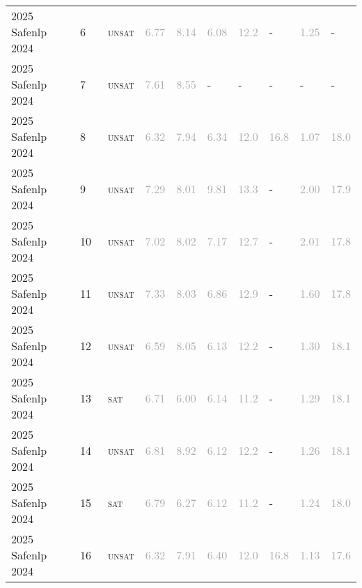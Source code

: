 \begin{center}
{\begin{longtable}{@{}llllllllll@{}}
2025 Safenlp 2024 & 6 & ~\textsc{unsat} & \textcolor{darkgray}{6.77} & \textcolor{darkgray}{8.14} & \textcolor{darkgray}{6.08} & \textcolor{darkgray}{12.2} & - & \textcolor{darkgray}{1.25} & - \\
2025 Safenlp 2024 & 7 & ~\textsc{unsat} & \textcolor{darkgray}{7.61} & \textcolor{darkgray}{8.55} & - & - & - & - & - \\
2025 Safenlp 2024 & 8 & ~\textsc{unsat} & \textcolor{darkgray}{6.32} & \textcolor{darkgray}{7.94} & \textcolor{darkgray}{6.34} & \textcolor{darkgray}{12.0} & \textcolor{darkgray}{16.8} & \textcolor{darkgray}{1.07} & \textcolor{darkgray}{18.0} \\
2025 Safenlp 2024 & 9 & ~\textsc{unsat} & \textcolor{darkgray}{7.29} & \textcolor{darkgray}{8.01} & \textcolor{darkgray}{9.81} & \textcolor{darkgray}{13.3} & - & \textcolor{darkgray}{2.00} & \textcolor{darkgray}{17.9} \\
2025 Safenlp 2024 & 10 & ~\textsc{unsat} & \textcolor{darkgray}{7.02} & \textcolor{darkgray}{8.02} & \textcolor{darkgray}{7.17} & \textcolor{darkgray}{12.7} & - & \textcolor{darkgray}{2.01} & \textcolor{darkgray}{17.8} \\
2025 Safenlp 2024 & 11 & ~\textsc{unsat} & \textcolor{darkgray}{7.33} & \textcolor{darkgray}{8.03} & \textcolor{darkgray}{6.86} & \textcolor{darkgray}{12.9} & - & \textcolor{darkgray}{1.60} & \textcolor{darkgray}{17.8} \\
2025 Safenlp 2024 & 12 & ~\textsc{unsat} & \textcolor{darkgray}{6.59} & \textcolor{darkgray}{8.05} & \textcolor{darkgray}{6.13} & \textcolor{darkgray}{12.2} & - & \textcolor{darkgray}{1.30} & \textcolor{darkgray}{18.1} \\
2025 Safenlp 2024 & 13 & ~\textsc{sat} & \textcolor{darkgray}{6.71} & \textcolor{darkgray}{6.00} & \textcolor{darkgray}{6.14} & \textcolor{darkgray}{11.2} & - & \textcolor{darkgray}{1.29} & \textcolor{darkgray}{18.1} \\
2025 Safenlp 2024 & 14 & ~\textsc{unsat} & \textcolor{darkgray}{6.81} & \textcolor{darkgray}{8.92} & \textcolor{darkgray}{6.12} & \textcolor{darkgray}{12.2} & - & \textcolor{darkgray}{1.26} & \textcolor{darkgray}{18.1} \\
2025 Safenlp 2024 & 15 & ~\textsc{sat} & \textcolor{darkgray}{6.79} & \textcolor{darkgray}{6.27} & \textcolor{darkgray}{6.12} & \textcolor{darkgray}{11.2} & - & \textcolor{darkgray}{1.24} & \textcolor{darkgray}{18.0} \\
2025 Safenlp 2024 & 16 & ~\textsc{unsat} & \textcolor{darkgray}{6.32} & \textcolor{darkgray}{7.91} & \textcolor{darkgray}{6.40} & \textcolor{darkgray}{12.0} & \textcolor{darkgray}{16.8} & \textcolor{darkgray}{1.13} & \textcolor{darkgray}{17.6} \\

\end{longtable}}
\end{center}

